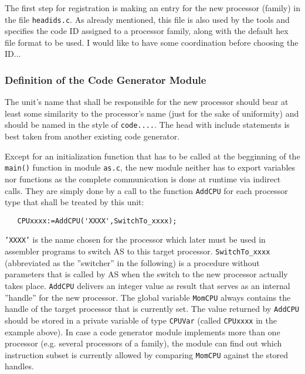 \documentclass[12pt,twoside]{report}
\newcommand{\tty}[1]{{\tt #1}}
\begin{document}
The first step for registration is making an entry for the new processor
(family) in the file {\tt headids.c}.  As already mentioned, this file is
also used by the tools and specifies the code ID assigned to a processor
family, along with the default hex file format to be used.  I would like
to have some coordination before choosing the ID...

\subsubsection{Definition of the Code Generator Module}

The unit's name that shall be responsible for the new processor
should bear at least some similarity to the processor's name (just
for the sake of uniformity) and should be named in the style of
\tty{code....}.  The head with include statements is best taken from
another existing code generator.

Except for an initialization function that has to be called at the
begginning of the {\tt main()} function in module {\tt as.c}, the new
module neither has to export variables nor functions as the complete
communication is done at runtime via indirect calls.  They are simply done
by a call to the function
\tty{AddCPU} for each processor type that shall be treated by this unit:
\begin{verbatim}
   CPUxxxx:=AddCPU('XXXX',SwitchTo_xxxx);
\end{verbatim}
\tty{'XXXX'} is the name chosen for the processor which later must be used
in assembler programs to switch AS to this target processor.
\tty{SwitchTo\_xxxx} (abbreviated as the ''switcher'' in the following) is
a procedure without parameters that is called by AS when the switch to the
new processor actually takes place.  \tty{AddCPU} delivers an integer
value as result that serves as an internal ''handle'' for the new
processor.  The global variable \tty{MomCPU} always contains the handle of
the target processor that is currently set.  The value returned by
\tty{AddCPU} should be stored in a private variable of type \tty{CPUVar}
(called \tty{CPUxxxx} in the example above).  In case a code generator
module implements more than one processor (e.g. several processors of a
family), the module can find out which instruction subset is currently
allowed by comparing \tty{MomCPU} against the stored handles.
\end{document}
